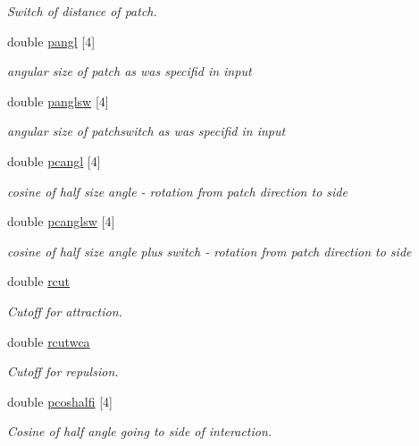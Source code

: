 \begin{DoxyCompactItemize}
\begin{DoxyCompactList}\small\item\em Switch of distance of patch. \end{DoxyCompactList}\item 
double \hyperlink{class_ia__param_a8b6be7ac5589120595dbbecb0573b4a4}{pangl} \mbox{[}4\mbox{]}
\begin{DoxyCompactList}\small\item\em angular size of patch as was specifid in input \end{DoxyCompactList}\item 
double \hyperlink{class_ia__param_a4135a2a675b1087915a103c9a528c307}{panglsw} \mbox{[}4\mbox{]}
\begin{DoxyCompactList}\small\item\em angular size of patchswitch as was specifid in input \end{DoxyCompactList}\item 
double \hyperlink{class_ia__param_a9b41eeb7c326fd32a095499d42a134fb}{pcangl} \mbox{[}4\mbox{]}
\begin{DoxyCompactList}\small\item\em cosine of half size angle -\/ rotation from patch direction to side \end{DoxyCompactList}\item 
double \hyperlink{class_ia__param_ab0fef38181fd2df68e838ba1abc0e0ef}{pcanglsw} \mbox{[}4\mbox{]}
\begin{DoxyCompactList}\small\item\em cosine of half size angle plus switch -\/ rotation from patch direction to side \end{DoxyCompactList}\item 
double \hyperlink{class_ia__param_abd72fc915c8c5d7c1786c765e808bcd4}{rcut}
\begin{DoxyCompactList}\small\item\em Cutoff for attraction. \end{DoxyCompactList}\item 
double \hyperlink{class_ia__param_a9a7d011fda48b10b3f6c005eddb433e4}{rcutwca}
\begin{DoxyCompactList}\small\item\em Cutoff for repulsion. \end{DoxyCompactList}\item 
double \hyperlink{class_ia__param_a6836ed2a44748c8b1f71219c01b5a713}{pcoshalfi} \mbox{[}4\mbox{]}
\begin{DoxyCompactList}\small\item\em Cosine of half angle going to side of interaction. \end{DoxyCompactList}\item 

\end{DoxyCompactItemize}
